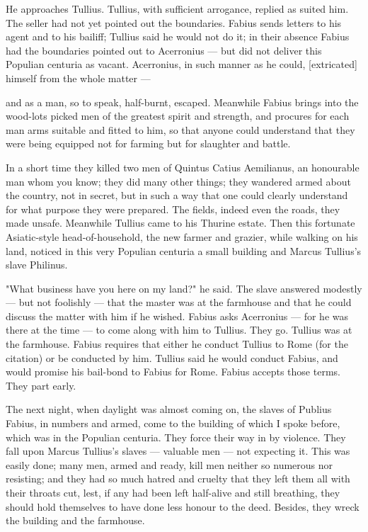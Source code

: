  He approaches Tullius. Tullius, with sufficient arrogance, replied as suited him. The seller had not yet pointed out the boundaries. Fabius sends letters to his agent and to his bailiff; Tullius said he would not do it; in their absence Fabius had the boundaries pointed out to Acerronius --- but did not deliver this Populian centuria as vacant. Acerronius, in such manner as he could, [extricated] himself from the whole matter ---

 and as a man, so to speak, half-burnt, escaped. Meanwhile Fabius brings into the wood-lots picked men of the greatest spirit and strength, and procures for each man arms suitable and fitted to him, so that anyone could understand that they were being equipped not for farming but for slaughter and battle.

 In a short time they killed two men of Quintus Catius Aemilianus, an honourable man whom you know; they did many other things; they wandered armed about the country, not in secret, but in such a way that one could clearly understand for what purpose they were prepared. The fields, indeed even the roads, they made unsafe. Meanwhile Tullius came to his Thurine estate. Then this fortunate Asiatic-style head-of-household, the new farmer and grazier, while walking on his land, noticed in this very Populian centuria a small building and Marcus Tullius's slave Philinus.

 "What business have you here on my land?" he said. The slave answered modestly --- but not foolishly --- that the master was at the farmhouse and that he could discuss the matter with him if he wished. Fabius asks Acerronius --- for he was there at the time --- to come along with him to Tullius. They go. Tullius was at the farmhouse. Fabius requires that either he conduct Tullius to Rome (for the citation) or be conducted by him. Tullius said he would conduct Fabius, and would promise his bail-bond to Fabius for Rome. Fabius accepts those terms. They part early.

 The next night, when daylight was almost coming on, the slaves of Publius Fabius, in numbers and armed, come to the building of which I spoke before, which was in the Populian centuria. They force their way in by violence. They fall upon Marcus Tullius's slaves --- valuable men --- not expecting it. This was easily done; many men, armed and ready, kill men neither so numerous nor resisting; and they had so much hatred and cruelty that they left them all with their throats cut, lest, if any had been left half-alive and still breathing, they should hold themselves to have done less honour to the deed. Besides, they wreck the building and the farmhouse.

